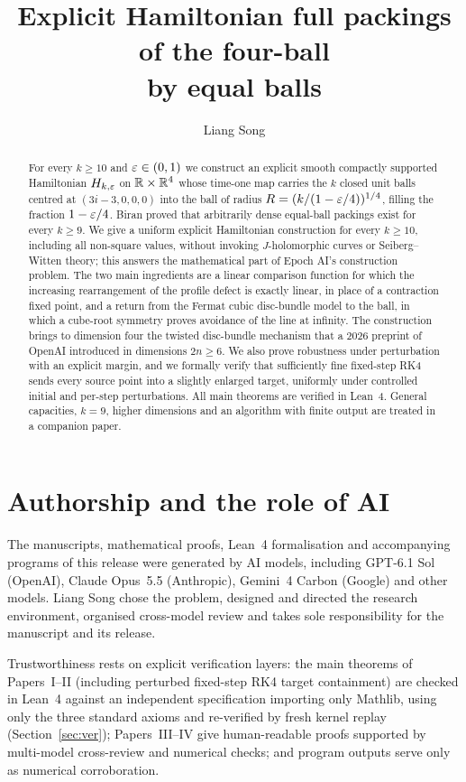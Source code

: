 \documentclass[11pt]{amsart}
\title[Explicit Hamiltonian packings of the four-ball]{Explicit Hamiltonian full packings of the four-ball\\ by equal balls}
\author{Liang Song}
\date{}
\begin{document}
\begin{abstract}
For every $k\ge10$ and $\varepsilon\in(0,1)$ we construct an explicit smooth compactly supported Hamiltonian $H_{k,\varepsilon}$ on
$\mathbb{R}\times\mathbb{R}^4$ whose time-one map carries the $k$ closed unit balls centred at $(3i-3,0,0,0)$ into the ball of radius
$R=(k/(1-\varepsilon/4))^{1/4}$, filling the fraction $1-\varepsilon/4$. Biran proved that arbitrarily dense equal-ball packings exist
for every $k\ge9$. We give a uniform explicit Hamiltonian construction for every $k\ge10$, including all non-square
values, without invoking $J$-holomorphic curves or Seiberg--Witten theory; this answers the mathematical part of Epoch
AI's construction problem. The two main ingredients are a linear comparison function for which the increasing
rearrangement of the profile defect is exactly linear, in place of a contraction fixed point, and a return from the
Fermat cubic disc-bundle model to the ball, in which a cube-root symmetry proves avoidance of the line at infinity.
The construction brings to dimension four the twisted disc-bundle mechanism that a 2026 preprint of OpenAI introduced in
dimensions $2n\ge6$. We also prove robustness under perturbation with an explicit margin, and we formally verify that
sufficiently fine fixed-step RK4 sends every source point into a slightly enlarged target, uniformly under controlled
initial and per-step perturbations. All main theorems are verified in Lean~4. General capacities, $k=9$, higher
dimensions and an algorithm with finite output are treated in a companion paper.
\end{abstract}
\maketitle










\section*{Authorship and the role of AI}

The manuscripts, mathematical proofs, Lean~4 formalisation and accompanying programs of this release were generated by
AI models, including GPT-6.1 Sol (OpenAI), Claude Opus~5.5 (Anthropic), Gemini~4 Carbon (Google) and other models.
Liang Song chose the problem, designed and directed the research environment, organised cross-model review and takes
sole responsibility for the manuscript and its release.

Trustworthiness rests on explicit verification layers: the main theorems of Papers~I--II (including perturbed
fixed-step RK4 target containment) are checked in Lean~4 against an independent specification importing only Mathlib,
using only the three standard axioms and re-verified by fresh kernel replay (Section~\ref{sec:ver}); Papers~III--IV
give human-readable proofs supported by multi-model cross-review and numerical checks; and program outputs serve only
as numerical corroboration.



\end{document}

